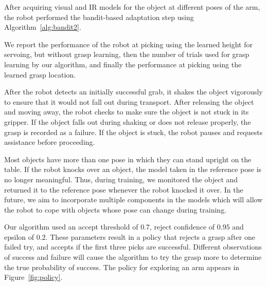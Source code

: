 \documentclass{article}
\newcommand{\algorithmCTxt}{Ordered Confidence Bound\xspace}
\begin{document}
After acquiring visual and IR models for the object at different poses
of the arm, the robot performed the bandit-based adaptation step using
Algorithm~\ref{alg:bandit2}.

We report the performance of the robot at picking using the learned
height for servoing, but without grasp learning, then the number of
trials used for grasp learning by our algorithm, and finally the
performance at picking using the learned grasp location.

After the robot detects an initially successful grab, it shakes the
object vigorously to ensure that it would not fall out during
transport. After releasing the object and moving away, the robot
checks to make sure the object is not stuck in its gripper. If the
object falls out during shaking or does not release properly, the
grasp is recorded as a failure. If the object is stuck, the robot
pauses and requests assistance before proceeding.

Most objects have more than one pose in which they can stand upright
on the table. If the robot knocks over an object, the model taken in
the reference pose is no longer meaningful. Thus, during training, we
monitored the object and returned it to the reference pose whenever
the robot knocked it over. In the future, we aim to incorporate
multiple components in the models which will allow the robot to cope
with objects whose pose can change during training.

Our algorithm used an accept threshold of $0.7$, reject confidence of
$0.95$ and epsilon of $0.2$.  These parameters result in a policy that
rejects a grasp after one failed try, and accepts if the first three
picks are successful.  Different observations of success and failure
will cause the algorithm to try the grasp more to determine the true
probability of success.  The policy for exploring an arm appears in
Figure~\ref{fig:policy}.

\end{document}
